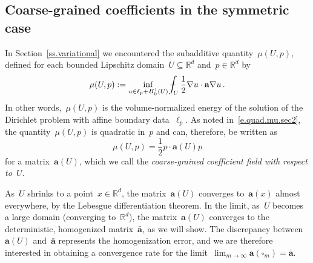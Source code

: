 \documentclass[11pt,twoside]{article} %
\let\oldsquare\square %
\renewcommand{\square}{\oldsquare}
\numberwithin{equation}{section}
\theoremstyle{definition}
\newcommand*{\Rd}{\ensuremath{\mathbb{R}^d}}
\renewcommand{\a}{\mathbf{a}}
\newcommand{\ahom}{\bar{\a}}
\newcommand{\cu}{\square}
\def\Xint#1{\mathchoice
{\XXint\displaystyle\textstyle{#1}}%
{\XXint\textstyle\scriptstyle{#1}}%
{\XXint\scriptstyle\scriptscriptstyle{#1}}%
{\XXint\scriptscriptstyle\scriptscriptstyle{#1}}%
\!\int}
\def\XXint#1#2#3{{\setbox0=\hbox{$#1{#2#3}{\int}$}
\vcenter{\hbox{$#2#3$}}\kern-.5\wd0}}
\def\fint{\Xint-}
\begin{document}
\subsection{Coarse-grained coefficients in the symmetric case}
\label{ss.subadd}

In Section~\ref{ss.variational} we encountered the subadditive quantity~$\mu(U,p)$, defined for each bounded Lipschitz domain~$U\subseteq \Rd$ and~$p\in\Rd$ by
\begin{equation}
\label{e.mu}
\mu(U,p) 
:= \inf_{u \in \ell_p+H^1_0(U)} 
\fint_U \frac12\nabla u \cdot \a\nabla u 
\,.
\end{equation}
In other words,~$\mu(U,p)$ is the volume-normalized energy of the solution of the Dirichlet problem with affine boundary data~$\ell_p$.
As noted in~\eqref{e.quad.mu.sec2}, the quantity~$\mu(U,p)$ is quadratic in~$p$ and  
can, therefore, be written as
\begin{equation}
\label{e.quad.mu}
\mu(U,p) = \frac12 p\cdot \a(U) p
\end{equation}
for a matrix~$\a(U)$, which we call the \emph{coarse-grained coefficient field with respect to~$U$}.

\smallskip

As~$U$ shrinks to a point~$x\in\Rd$, the matrix~$\a(U)$ converges to~$\a(x)$ almost everywhere, by the Lebesgue differentiation theorem. In the limit, as~$U$ becomes a large domain (converging to~$\Rd$), the matrix~$\a(U)$ converges to the deterministic, homogenized matrix~$\ahom$, as we will show. The discrepancy between~$\a(U)$ and~$\ahom$ represents the homogenization error, and we are therefore interested in obtaining a convergence rate for the limit~$\lim_{m\to \infty} \a(\cu_m) = \ahom$.

\smallskip
\end{document}
